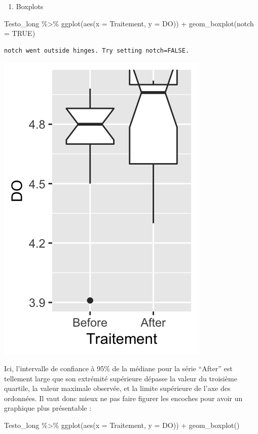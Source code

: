 \documentclass[
  a4paper,
]{article}
\newenvironment{Shaded}{\begin{snugshade}}{\end{snugshade}}
\newcommand{\AttributeTok}[1]{\textcolor[rgb]{0.00,0.34,0.68}{#1}}
\newcommand{\ConstantTok}[1]{\textcolor[rgb]{0.67,0.33,0.00}{#1}}
\newcommand{\FunctionTok}[1]{\textcolor[rgb]{0.39,0.29,0.61}{#1}}
\newcommand{\NormalTok}[1]{\textcolor[rgb]{0.12,0.11,0.11}{#1}}
\newcommand{\SpecialCharTok}[1]{\textcolor[rgb]{0.24,0.68,0.91}{#1}}
\providecommand{\tightlist}{%
  \setlength{\itemsep}{0pt}\setlength{\parskip}{0pt}}
\begin{document}
\begin{enumerate}
\def\labelenumi{\arabic{enumi}.}
\setcounter{enumi}{2}
\tightlist
\item
  Boxplots
\end{enumerate}

\begin{Shaded}
\begin{Highlighting}[]
\NormalTok{Testo\_long }\SpecialCharTok{\%\textgreater{}\%} 
  \FunctionTok{ggplot}\NormalTok{(}\FunctionTok{aes}\NormalTok{(}\AttributeTok{x =}\NormalTok{ Traitement, }\AttributeTok{y =}\NormalTok{ DO)) }\SpecialCharTok{+}
  \FunctionTok{geom\_boxplot}\NormalTok{(}\AttributeTok{notch =} \ConstantTok{TRUE}\NormalTok{)}
\end{Highlighting}
\end{Shaded}

\begin{verbatim}
notch went outside hinges. Try setting notch=FALSE.
\end{verbatim}

\begin{center}\includegraphics[width=0.25\linewidth]{figure/unnamed-chunk-34-1} \end{center}

Ici, l'intervalle de confiance à 95\% de la médiane pour la série ``After'' est tellement large que son extrémité supérieure dépasse la valeur du troisième quartile, la valeur maximale observée, et la limite supérieure de l'axe des ordonnées. Il vaut donc mieux ne pas faire figurer les encoches pour avoir un graphique plus présentable :

\begin{Shaded}
\begin{Highlighting}[]
\NormalTok{Testo\_long }\SpecialCharTok{\%\textgreater{}\%} 
  \FunctionTok{ggplot}\NormalTok{(}\FunctionTok{aes}\NormalTok{(}\AttributeTok{x =}\NormalTok{ Traitement, }\AttributeTok{y =}\NormalTok{ DO)) }\SpecialCharTok{+}
  \FunctionTok{geom\_boxplot}\NormalTok{()}
\end{Highlighting}
\end{Shaded}
\end{document}
